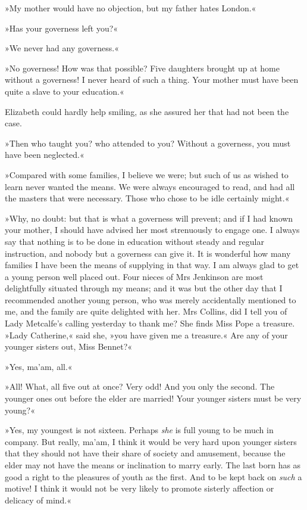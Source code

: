 »My mother would have no objection, but my father hates London.«

»Has your governess left you?«

»We never had any governess.«

»No governess! How was that possible? Five daughters brought up at home without a governess! I never heard of such a thing. Your mother must have been quite a slave to your education.«

Elizabeth could hardly help smiling, as she assured her that had not been the case.

»Then who taught you? who attended to you? Without a governess, you must have been neglected.«

»Compared with some families, I believe we were; but such of us as wished to learn never wanted the means. We were always encouraged to read, and had all the masters that were necessary. Those who chose to be idle certainly might.«

»Why, no doubt: but that is what a governess will prevent; and if I had known your mother, I should have advised her most strenuously to engage one. I always say that nothing is to be done in education without steady and regular instruction, and nobody but a governess can give it. It is wonderful how many families I have been the means of supplying in that way. I am always glad to get a young person well placed out. Four nieces of Mrs Jenkinson are most delightfully situated through my means; and it was but the other day that I recommended another young person, who was merely accidentally mentioned to me, and the family are quite delighted with her. Mrs Collins, did I tell you of Lady Metcalfe's calling yesterday to thank me? She finds Miss Pope a treasure. »Lady Catherine,« said she, »you have given me a treasure.« Are any of your younger sisters out, Miss Bennet?«

»Yes, ma'am, all.«

»All! What, all five out at once? Very odd! And you only the second. The younger ones out before the elder are married! Your younger sisters must be very young?«

»Yes, my youngest is not sixteen. Perhaps \textit{she} is full young to be much in company. But really, ma'am, I think it would be very hard upon younger sisters that they should not have their share of society and amusement, because the elder may not have the means or inclination to marry early. The last born has as good a right to the pleasures of youth as the first. And to be kept back on \textit{such} a motive! I think it would not be very likely to promote sisterly affection or delicacy of mind.«

